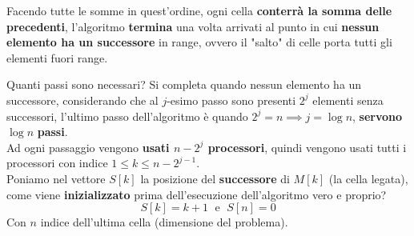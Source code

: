 \documentclass[11pt]{article}
\begin{document}
\begin{center}
	\end{center}
	
	Facendo tutte le somme in quest'ordine, ogni cella \textbf{conterrà la somma delle precedenti}, l'algoritmo \textbf{termina} una volta arrivati al punto in cui \textbf{nessun elemento ha un successore} in range, ovvero il "salto" di celle porta tutti gli elementi fuori range.\\
	
	\newpage
	
	Quanti passi sono necessari? Si completa quando nessun elemento ha un successore, considerando che al $j$-esimo passo sono presenti $2^j$ elementi senza successori, l'ultimo passo dell'algoritmo è quando $2^j = n \implies j = \log n$, \textbf{servono} $\log n$ \textbf{passi}.\\
	
	Ad ogni passaggio vengono \textbf{usati $n-2^j$ processori}, quindi vengono usati tutti i processori con indice $1 \leq k \leq n - 2^{j-1}$.\\
	
	Poniamo nel vettore $S[k]$ la posizione del \textbf{successore} di $M[k]$ (la cella legata), come viene \textbf{inizializzato} prima dell'esecuzione dell'algoritmo vero e proprio?
	$$S[k] = k+1 \; \text{ e } \; S[n] = 0$$
	Con $n$ indice dell'ultima cella (dimensione del problema).\\
	
\end{document}
